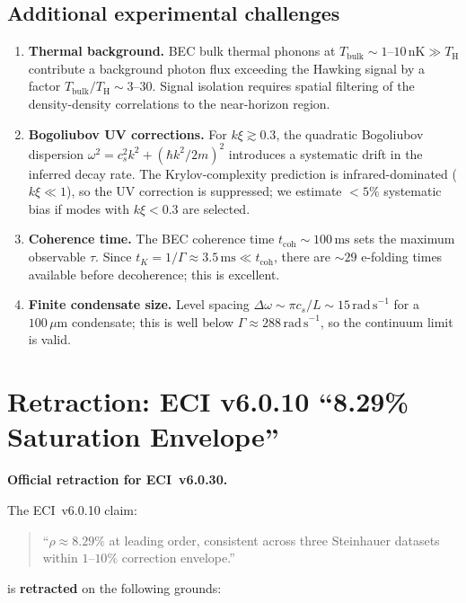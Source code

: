 \documentclass[12pt,a4paper]{article}
\renewcommand{\TH}{T_{\mathrm{H}}}
\begin{document}
\subsection{Additional experimental challenges}

\begin{enumerate}
\item \textbf{Thermal background.} BEC bulk thermal phonons at
  $T_{\mathrm{bulk}} \sim 1$--$10\,\mathrm{nK} \gg \TH$ contribute a
  background photon flux exceeding the Hawking signal by a factor
  $T_{\mathrm{bulk}}/\TH \sim 3$--$30$.
  Signal isolation requires spatial filtering of the density-density
  correlations to the near-horizon region.

\item \textbf{Bogoliubov UV corrections.} For $k\xi \gtrsim 0.3$, the
  quadratic Bogoliubov dispersion $\omega^2 = c_s^2k^2 + (\hbar k^2/2m)^2$
  introduces a systematic drift in the inferred decay rate.
  The Krylov-complexity prediction is infrared-dominated ($k\xi \ll 1$),
  so the UV correction is suppressed; we estimate $<5\%$ systematic
  bias if modes with $k\xi < 0.3$ are selected.

\item \textbf{Coherence time.} The BEC coherence time $t_{\mathrm{coh}}
  \sim 100\,\mathrm{ms}$ sets the maximum observable $\tau$.
  Since $t_K = 1/\Gamma \approx 3.5\,\mathrm{ms} \ll t_{\mathrm{coh}}$,
  there are $\sim 29$ e-folding times available before decoherence; this
  is excellent.

\item \textbf{Finite condensate size.} Level spacing
  $\Delta\omega \sim \pi c_s/L \sim 15\,\mathrm{rad\,s}^{-1}$ for a
  $100\,\mu\mathrm{m}$ condensate; this is well below $\Gamma \approx
  288\,\mathrm{rad\,s}^{-1}$, so the continuum limit is valid.
\end{enumerate}

\section{Retraction: ECI v6.0.10 ``8.29\% Saturation Envelope''}
\label{sec:retraction}

\textbf{Official retraction for ECI~v6.0.30.}

The ECI~v6.0.10 claim:
\begin{quote}
``$\rho \approx 8.29\%$ at leading order, consistent across three
Steinhauer datasets within $1$--$10\%$ correction envelope.''
\end{quote}
is \textbf{retracted} on the following grounds:
\end{document}
